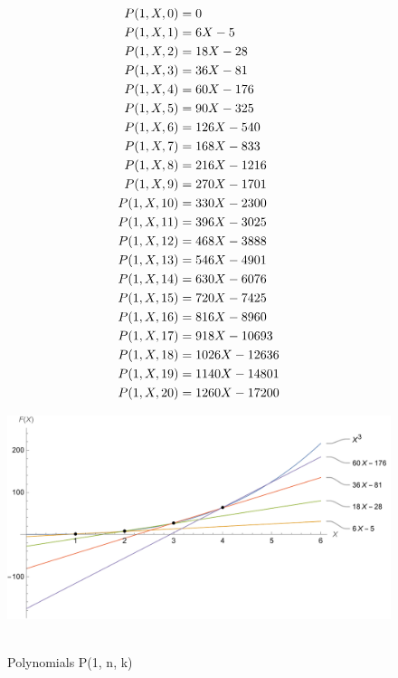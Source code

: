 ﻿
\begin{align*}
    {P}(1,X,0) &= 0 \\
    {P}(1,X,1) &= 6X - 5 \\
    {P}(1,X,2) &= 18X - 28 \\
    {P}(1,X,3) &= 36X - 81 \\
    {P}(1,X,4) &= 60X - 176 \\
    {P}(1,X,5) &= 90X - 325 \\
    {P}(1,X,6) &= 126X - 540 \\
    {P}(1,X,7) &= 168X - 833 \\
    {P}(1,X,8) &= 216X - 1216 \\
    {P}(1,X,9) &= 270X - 1701 \\
    {P}(1,X,10) &= 330X - 2300 \\
    {P}(1,X,11) &= 396X - 3025 \\
    {P}(1,X,12) &= 468X - 3888 \\
    {P}(1,X,13) &= 546X - 4901 \\
    {P}(1,X,14) &= 630X - 6076 \\
    {P}(1,X,15) &= 720X - 7425 \\
    {P}(1,X,16) &= 816X - 8960 \\
    {P}(1,X,17) &= 918X - 10693 \\
    {P}(1,X,18) &= 1026X - 12636 \\
    {P}(1,X,19) &= 1140X - 14801 \\
    {P}(1,X,20) &= 1260X - 17200
\end{align*}
\begin{figure}[H]
    \centering
    \includegraphics[width=1\textwidth]{sections/images/01_cubes_with_p_1_n_k}
    ~\caption{Polynomials P(1, n, k)}\label{fig:figure}
\end{figure}
